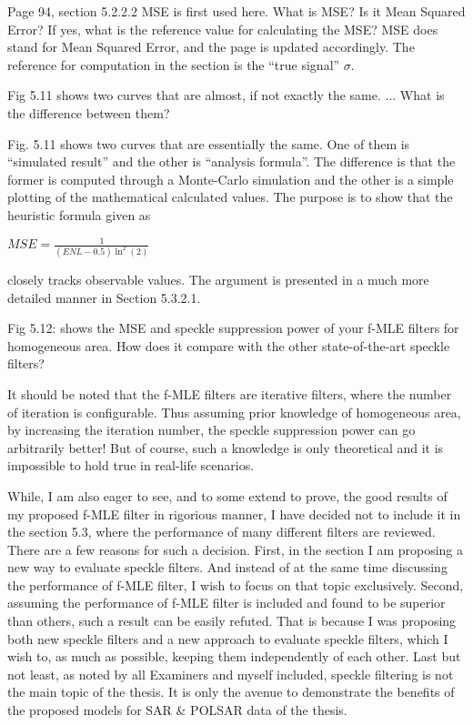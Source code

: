 \replyToComment
    {Page 94, section 5.2.2.2 MSE is first used here. What is MSE? Is it Mean Squared Error? If yes, what is the reference value for calculating the MSE?}
    {MSE does stand for Mean Squared Error, and the page is updated accordingly.
The reference for computation in the section is the ``true signal'' $\sigma$.
}

\replyToComment
    {Fig 5.11  shows two curves that are almost, if not exactly the same. ...
What is the difference between them?}
    {Fig. 5.11 shows two curves that are essentially the same.
One of them is ``simulated result'' and the other is ``analysis formula''.
The difference is that the former is computed through a Monte-Carlo simulation and the other is a simple plotting of the mathematical calculated values.
The purpose is to show that the heuristic formula given as

\begin{center}
  $MSE = \frac{1}{(ENL-0.5)\ln^2(2)}$
\end{center}  

closely tracks observable values.
The argument is presented in a much more detailed manner in Section 5.3.2.1.
}

\replyToComment
    {Fig 5.12: shows the MSE and speckle suppression power of your f-MLE filters for homogeneous area. How does it compare with the other state-of-the-art speckle filters?}
    {
      It should be noted that the f-MLE filters are iterative filters, where the number of iteration is configurable.
      Thus assuming prior knowledge of homogeneous area, by increasing the iteration number, the speckle suppression power can go arbitrarily better!
      But of course, such a knowledge is only theoretical and it is impossible to hold true in real-life scenarios.

While, I am also eager to see, and to some extend to prove, the good results of my proposed f-MLE filter in rigorious manner,
  I have decided not to include it in the section 5.3, where the performance of many different filters are reviewed.
There are a few reasons for such a decision.
First, in the section I am proposing a new way to evaluate speckle filters.
And instead of at the same time discussing the performance of f-MLE filter, I wish to focus on that topic exclusively.
Second, assuming the performance of f-MLE filter is included and found to be superior than others,
  such a result can be easily refuted.
That is because I was proposing both new speckle filters and a new approach to evaluate speckle filters,
  which I wish to, as much as possible, keeping them independently of each other.
Last but not least, as noted by all Examiners and myself included, speckle filtering is not the main topic of the thesis.
It is only the avenue to demonstrate the benefits of the proposed models for SAR \& POLSAR data of the thesis.
    }

